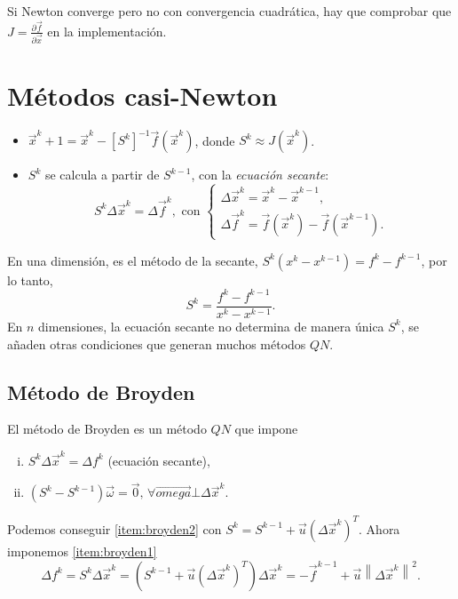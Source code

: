 \begin{obs}
    Si Newton converge pero no con convergencia cuadr\'atica, hay que comprobar que $J = \frac{\partial\vec{f}}{\partial\vec{x}}$ en la implementaci\'on.
\end{obs}

\section{M\'etodos casi-Newton}

\begin{itemize}
    \item $\vec{x}^k+1 = \vec{x}^k - \left[ S^k \right]^{-1} \vec{f}\left( \vec{x}^k \right)$, donde $S^k \approx J\left( \vec{x}^k \right)$.
    \item $S^k$ se calcula a partir de $S^{k-1}$, con la \emph{ecuaci\'on secante}:
        \[
            S^k\Delta\vec{x}^k = \Delta \vec{f}^k,\text{ con }
            \begin{cases}
                \Delta\vec{x}^k = \vec{x}^k - \vec{x}^{k-1}, \\
                \Delta\vec{f}^k = \vec{f}\left( \vec{x}^k \right) - \vec{f}\left( \vec{x}^{k-1} \right).
            \end{cases}
        \]
\end{itemize}

\noindent En una dimensi\'on, es el m\'etodo de la secante, $S^k\left( x^k - x^{k-1} \right) = f^k - f^{k-1}$, por lo tanto,
\[
    S^k = \frac{f^k - f^{k-1}}{x^k - x^{k-1}}.
\]
\noindent En $n$ dimensiones, la ecuaci\'on secante no determina de manera \'unica $S^k$, se añaden otras condiciones que generan muchos m\'etodos $QN$.

\subsection{M\'etodo de Broyden}

\noindent El m\'etodo de Broyden es un m\'etodo $QN$ que impone
\begin{enumerate}[i)]
    \item\label{item:broyden1} $S^k\Delta\vec{x}^k = \Delta f^k$ (ecuaci\'on secante),
    \item\label{item:broyden2} $\left( S^k - S^{k-1} \right)\vec{\omega} = \vec{0}, \, \forall \vec{omega} \bot \Delta \vec{x}^k$.
\end{enumerate}

\noindent Podemos conseguir \ref{item:broyden2} con $S^k = S^{k-1} + \vec{u}\left( \Delta\vec{x}^k \right)^T$.
Ahora imponemos \ref{item:broyden1}
\[
    \Delta f^k = S^k\Delta \vec{x}^k = \left( S^{k-1}+\vec{u}\left( \Delta\vec{x}^k \right)^T \right)\Delta\vec{x}^k = -\vec{f}^{k-1} + \vec{u}\left\| \Delta \vec{x}^k\right\|^2.
\]

